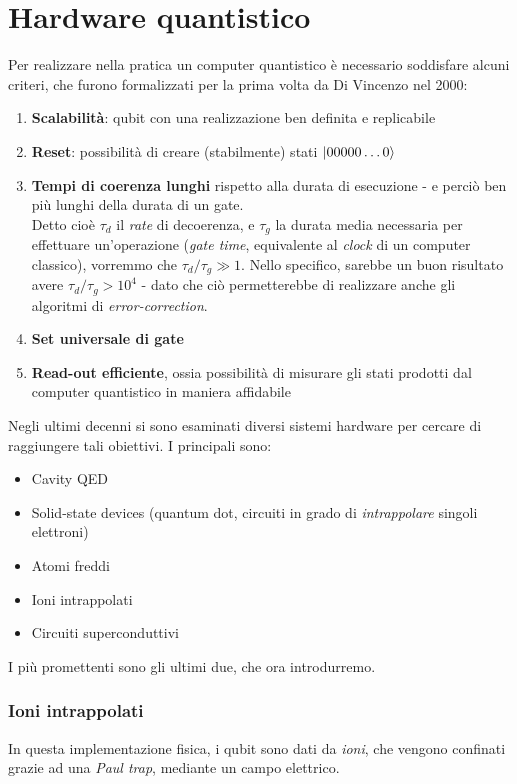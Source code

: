 \documentclass[../../InformazioneQuantistica.tex]{subfiles}
\begin{document}
\chapter{Hardware quantistico}
Per realizzare nella pratica un computer quantistico è necessario soddisfare alcuni criteri, che furono formalizzati per la prima volta da Di Vincenzo nel 2000:
\begin{enumerate}
\item \textbf{Scalabilità}: qubit con una realizzazione ben definita e replicabile
\item \textbf{Reset}: possibilità di creare (stabilmente) stati $\Ket{00000\dots 0}$
\item \textbf{Tempi di coerenza lunghi} rispetto alla durata di esecuzione - e perciò ben più lunghi della durata di un gate.\\
Detto cioè $\tau_d$ il \textit{rate} di decoerenza, e $\tau_g$ la durata media necessaria per effettuare un'operazione (\textit{gate time}, equivalente al \textit{clock} di un computer classico), vorremmo che $\tau_d/\tau_g \gg 1$. Nello specifico, sarebbe un buon risultato avere $\tau_d/\tau_g > 10^4$ - dato che ciò permetterebbe di realizzare anche gli algoritmi di \textit{error-correction}.
\item \textbf{Set universale di gate}
\item \textbf{Read-out efficiente}, ossia possibilità di misurare gli stati prodotti dal computer quantistico in maniera affidabile
\end{enumerate}

Negli ultimi decenni si sono esaminati diversi sistemi hardware per cercare di raggiungere tali obiettivi. I principali sono:
\begin{itemize}
\item Cavity QED
\item Solid-state devices (quantum dot, circuiti in grado di \textit{intrappolare} singoli elettroni)
\item Atomi freddi
\item Ioni intrappolati
\item Circuiti superconduttivi
\end{itemize}

I più promettenti sono gli ultimi due, che ora introdurremo.

\subsection{Ioni intrappolati}
In questa implementazione fisica, i qubit sono dati da \textit{ioni}, che vengono confinati grazie ad una \textit{Paul trap}, mediante un campo elettrico.
\end{document}
